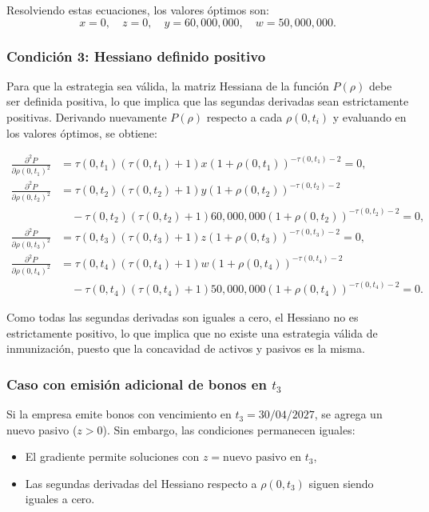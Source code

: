 \documentclass[12pt]{article}
\begin{document}
Resolviendo estas ecuaciones, los valores óptimos son:
\[ x = 0, \quad z = 0, \quad y = 60,000,000, \quad w = 50,000,000.\]

\subsubsection{Condición 3: Hessiano definido positivo}
Para que la estrategia sea válida, la matriz Hessiana de la función \(P(\rho)\) debe ser definida positiva, lo que implica que las segundas derivadas sean estrictamente positivas. Derivando nuevamente \(P(\rho)\) respecto a cada \(\rho(0,t_i)\) y evaluando en los valores óptimos, se obtiene:

\begin{align*}
    \frac{\partial^2 P}{\partial \rho(0,t_1)^2} & = \tau(0,t_1)(\tau(0,t_1)+1)x(1 + \rho(0,t_1))^{-\tau(0,t_1)-2} = 0, \\
    \frac{\partial^2 P}{\partial \rho(0,t_2)^2} & = \tau(0,t_2)(\tau(0,t_2)+1)y(1 + \rho(0,t_2))^{-\tau(0,t_2)-2} \\
    & \quad - \tau(0,t_2)(\tau(0,t_2)+1)60,000,000(1 + \rho(0,t_2))^{-\tau(0,t_2)-2} = 0, \\
    \frac{\partial^2 P}{\partial \rho(0,t_3)^2} & = \tau(0,t_3)(\tau(0,t_3)+1)z(1 + \rho(0,t_3))^{-\tau(0,t_3)-2} = 0, \\
    \frac{\partial^2 P}{\partial \rho(0,t_4)^2} & = \tau(0,t_4)(\tau(0,t_4)+1)w(1 + \rho(0,t_4))^{-\tau(0,t_4)-2} \\
    & \quad - \tau(0,t_4)(\tau(0,t_4)+1)50,000,000(1 + \rho(0,t_4))^{-\tau(0,t_4)-2} = 0.
\end{align*}


Como todas las segundas derivadas son iguales a cero, el Hessiano no es estrictamente positivo, lo que implica que no existe una estrategia válida de inmunización, puesto que la concavidad de activos y pasivos es la misma.

\subsubsection{Caso con emisión adicional de bonos en \(t_3\)}
Si la empresa emite bonos con vencimiento en \(t_3 = 30/04/2027\), se agrega un nuevo pasivo (\(z > 0\)). Sin embargo, las condiciones permanecen iguales:
\begin{itemize}
    \item El gradiente permite soluciones con \(z = \text{nuevo pasivo en } t_3\),
    \item Las segundas derivadas del Hessiano respecto a \(\rho(0,t_3)\) siguen siendo iguales a cero.
\end{itemize}
\end{document}
